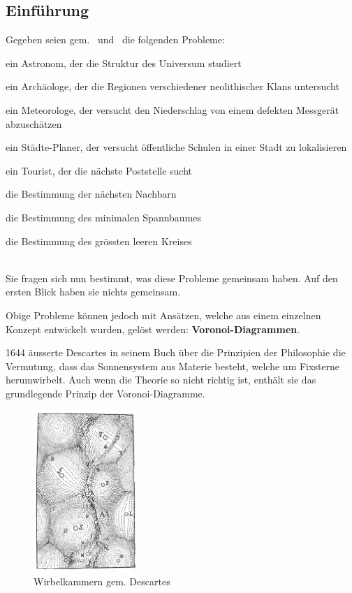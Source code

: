 \subsection{Einführung}
\label{subsec:voronoi-introduction}

Gegeben seien gem.~\cite{klein2005algorithmischegeometrie} und~\cite{atsuyuki2000spatialtessellations} die folgenden Probleme:

\begin{compactitem}
	\item ein Astronom, der die Struktur des Universum studiert
    \item ein Archäologe, der die Regionen verschiedener neolithischer Klans untersucht
    \item ein Meteorologe, der versucht den Niederschlag von einem defekten Messgerät abzuschätzen
    \item ein Städte-Planer, der versucht öffentliche Schulen in einer Stadt zu lokalisieren
    \item ein Tourist, der die nächste Poststelle sucht
    \item die Bestimmung der nächsten Nachbarn
    \item die Bestimmung des minimalen Spannbaumes
    \item die Bestimmung des grössten leeren Kreises
\end{compactitem}

\noindent\hspace*{0mm} \\Sie fragen sich nun bestimmt, was diese Probleme gemeinsam haben. Auf den ersten Blick haben sie nichts gemeinsam.

Obige Probleme können jedoch mit Ansätzen, welche aus einem einzelnen Konzept entwickelt wurden, gelöst werden: \textbf{Voronoi-Diagrammen}. \parencite{atsuyuki2000spatialtessellations}

1644 äusserte Descartes in seinem Buch über die Prinzipien der Philosophie die Vermutung, dass das Sonnensystem aus Materie besteht, welche um Fixsterne herumwirbelt.
Auch wenn die Theorie so nicht richtig ist, enthält sie das grundlegende Prinzip der Voronoi-Diagramme.\parencite{klein2005algorithmischegeometrie}

\begin{figure}
\centering
\includegraphics[width=150px]{images/descartes_vortices.jpg}
\caption{Wirbelkammern gem. Descartes}
\label{fig:descartesVortices}
\end{figure}

